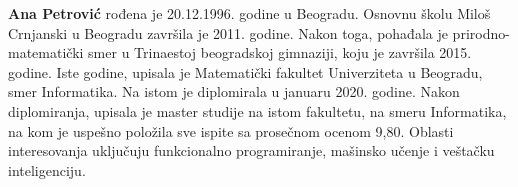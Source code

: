 \documentclass[12pt,oneside]{memoir}
\begin{document}
\backmatter

\begin{biografija}
\textbf{Ana Petrović} rođena je 20.12.1996. godine u Beogradu. Osnovnu školu Miloš Crnjanski u Beogradu završila je 2011. godine. Nakon toga, pohađala je prirodno-matematički smer u Trinaestoj beogradskoj gimnaziji, koju je završila 2015. godine. Iste godine, upisala je Matematički fakultet Univerziteta u Beogradu, smer Informatika. Na istom je diplomirala u januaru 2020. godine. Nakon diplomiranja, upisala je master studije na istom fakultetu, na smeru Informatika, na kom je uspešno položila sve ispite sa prosečnom ocenom 9,80. Oblasti interesovanja uključuju funkcionalno programiranje, mašinsko učenje i veštačku inteligenciju.
\end{biografija}
\end{document}
